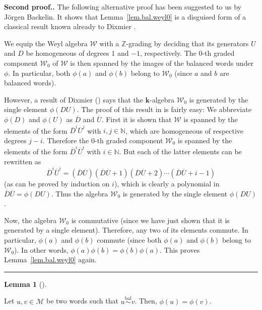 \documentclass[numbers=enddot,12pt,final,onecolumn,notitlepage]{scrartcl}%
\theoremstyle{definition}
\newtheorem{lem}[theo]{Lemma}
\newenvironment{lemma}[1][]
{\begin{lem}[#1]\begin{leftbar}}
{\end{leftbar}\end{lem}}
\newenvironment{proof}[1][Proof]{\noindent\textbf{#1.} }{\ \rule{0.5em}{0.5em}}
\newcommand{\W}{\mathcal{W}}
\newcommand{\M}{\mathcal{M}}
\newcommand{\kk}{\mathbf{k}}
\newcommand{\NN}{\mathbb{N}}
\newcommand{\ZZ}{\mathbb{Z}}
\newcommand{\balsim}{\overset{\operatorname*{bal}}{\sim}}
\newcommand{\tup}[1]{\left( #1 \right)}
\begin{document}
\begin{proof}[Second proof.]
The following alternative proof has been suggested to us by J\"orgen Backelin.
It shows that Lemma~\ref{lem.bal.weyl0} is a disguised form of a classical result known already to Dixmier \cite{Dixmie68}.

We equip the Weyl algebra
$\W$ with a $\ZZ$-grading by deciding that its generators $U$
and $D$ be homogeneous of degrees $1$ and $-1$, respectively. The $0$-th
graded component $\W_{0}$ of $\W$ is then spanned by the
images of the balanced words under $\phi$.
In particular, both $\phi\tup{a}$ and $\phi\tup{b}$ belong to $\W_0$ (since $a$ and $b$ are balanced words).

However, a result of Dixmier (\cite[last equation in \S 3.2]{Dixmie68}) says that the $\kk$-algebra
$\W_{0}$ is generated by the single element $\phi\left(  DU\right)$.
The proof of this result in \cite{Dixmie68} is fairly easy: We abbreviate
$\phi\left(  D\right)  $ and $\phi\left(  U\right)  $ as $\overline{D}$ and
$\overline{U}$. First it is shown that $\W$ is spanned by the
elements of the form $\overline{D}^{i}\overline{U}^{j}$ with $i,j\in
\NN$, which are homogeneous of respective degrees $j-i$. Therefore the
$0$-th graded component $\W_{0}$ is spanned by the elements of the
form $\overline{D}^{i}\overline{U}^{i}$ with $i\in\NN$. But each of the
latter elements can be rewritten as
\[
\overline{D}^{i}\overline{U}^{i}=\left(  \overline{D}\overline{U}\right)
\left(  \overline{D}\overline{U}+1\right)  \left(  \overline{D}\overline
{U}+2\right)  \cdots\left(  \overline{D}\overline{U}+i-1\right)
\]
(as can be proved by induction on $i$), which is clearly a polynomial in
$\overline{D}\overline{U}=\phi\left(  DU\right)  $. Thus the algebra
$\W_0$ is generated by the single element $\phi\left(  DU\right)$.

Now, the algebra $\W_0$ is commutative (since we have just shown that it is generated by a single element).
Therefore, any two of its elements commute.
In particular, $\phi\tup{a}$ and $\phi\tup{b}$ commute
(since both $\phi\tup{a}$ and $\phi\tup{b}$ belong to $\W_0$).
In other words, $\phi\tup{a} \phi\tup{b} = \phi\tup{b} \phi\tup{a}$.
This proves Lemma~\ref{lem.bal.weyl0} again.
\end{proof}

\begin{lemma}
\label{lem.bal.weyl}
Let $u,v\in\M$ be two words such that
$u \balsim v$. Then, $\phi\left(  u\right)
=\phi\left(  v\right)  $.
\end{lemma}
\end{document}
